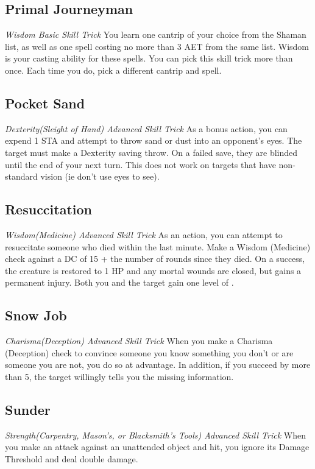 \subsection{Primal Journeyman}
\textit{Wisdom Basic Skill Trick}
You learn one cantrip of your choice from the Shaman list, as well as one spell costing no more than 3 AET from the same list. Wisdom is your casting ability for these spells. You can pick this skill trick more than once. Each time you do, pick a different cantrip and spell.

\subsection{Pocket Sand}
\textit{Dexterity(Sleight of Hand) Advanced Skill Trick}
As a bonus action, you can expend 1 STA and attempt to throw sand or dust into an opponent's eyes. The target must make a Dexterity saving throw. On a failed save, they are blinded until the end of your next turn. This does not work on targets that have non-standard vision (ie don't use eyes to see).

\subsection{Resuccitation}
\textit{Wisdom(Medicine) Advanced Skill Trick}
As an action, you can attempt to resuccitate someone who died within the last minute. Make a Wisdom (Medicine) check against a DC of 15 + the number of rounds since they died. On a success, the creature is restored to 1 HP and any mortal wounds are closed, but gains a permanent injury. Both you and the target gain one level of . 

\subsection{Snow Job}
\textit{Charisma(Deception) Advanced Skill Trick}
When you make a Charisma (Deception) check to convince someone you know something you don't or are someone you are not, you do so at advantage. In addition, if you succeed by more than 5, the target willingly tells you the missing information.

\subsection{Sunder}
\textit{Strength(Carpentry, Mason's, or Blacksmith's Tools) Advanced Skill Trick}
When you make an attack against an unattended object and hit, you ignore its Damage Threshold and deal double damage. 

